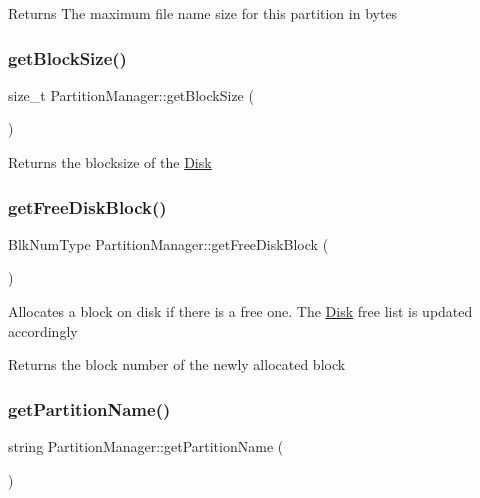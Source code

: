 \begin{DoxyReturn}{Returns}
The maximum file name size for this partition in bytes 
\end{DoxyReturn}
\mbox{\label{classPartitionManager_aa1026e17e77f154d7034fafd188bda02}} 
\subsubsection{\texorpdfstring{get\+Block\+Size()}{getBlockSize()}}
{\footnotesize\ttfamily size\+\_\+t Partition\+Manager\+::get\+Block\+Size (\begin{DoxyParamCaption}{ }\end{DoxyParamCaption})}

\begin{DoxyReturn}{Returns}
the blocksize of the \mbox{\hyperlink{classDisk}{Disk}} 
\end{DoxyReturn}
\mbox{\label{classPartitionManager_a682ce5963a31cf7009455cb1c229b26a}} 
\subsubsection{\texorpdfstring{get\+Free\+Disk\+Block()}{getFreeDiskBlock()}}
{\footnotesize\ttfamily Blk\+Num\+Type Partition\+Manager\+::get\+Free\+Disk\+Block (\begin{DoxyParamCaption}{ }\end{DoxyParamCaption})}

Allocates a block on disk if there is a free one. The \mbox{\hyperlink{classDisk}{Disk}} free list is updated accordingly \begin{DoxyReturn}{Returns}
the block number of the newly allocated block 
\end{DoxyReturn}
\mbox{\label{classPartitionManager_a7c756dba2665e5a7b62b2ccb261f1158}} 
\subsubsection{\texorpdfstring{get\+Partition\+Name()}{getPartitionName()}}
{\footnotesize\ttfamily string Partition\+Manager\+::get\+Partition\+Name (\begin{DoxyParamCaption}{ }\end{DoxyParamCaption})}


